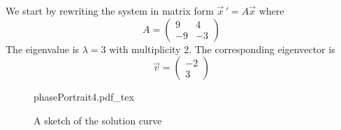 \documentclass[11pt, titlepage]{article}
\begin{document}
  \begin{solution}
    We start by rewriting the system in matrix form \(\vec{x} \,' = A \vec{x}\) where
    \begin{equation*}
      A =
      \begin{pmatrix}
        9 & 4 \\
        -9 & - 3
      \end{pmatrix}
    \end{equation*}
    The eigenvalue is \(\lambda = 3\) with multiplicity 2.
    The corresponding eigenvector is
    \begin{equation*}
      \vec{v} =
      \begin{pmatrix}
        -2 \\
        3
      \end{pmatrix}
    \end{equation*}
    \begin{figure}[h]
      \centering
      \def\svgwidth{0.5\columnwidth}
      {phasePortrait4.pdf_tex}
      \captionsetup{labelformat=empty}
      \caption{A sketch of the solution curve}
    \end{figure}
  \end{solution}
\end{document}

